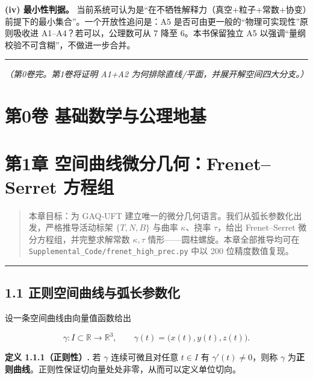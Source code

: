 \textbf{(iv) 最小性判据。}
当前系统可认为是``在不牺牲解释力（真空+粒子+常数+协变）前提下的最小集合''。一个开放性追问是：A5
是否可由更一般的``物理可实现性''原则吸收进 A1--A4？若可以，公理数可从 7
降至 6。本书保留独立 A5 以强调``量纲校验不可含糊''，不做进一步合并。

\begin{center}\rule{0.5\linewidth}{0.5pt}\end{center}

\emph{（第0卷完。第1卷将证明 A1+A2
为何排除直线/平面，并展开解空间四大分支。）}

\section{第0卷
基础数学与公理地基}\label{ux7b2c0ux5377-ux57faux7840ux6570ux5b66ux4e0eux516cux7406ux5730ux57fa}

\section{第1章 空间曲线微分几何：Frenet--Serret
方程组}\label{ux7b2c1ux7ae0-ux7a7aux95f4ux66f2ux7ebfux5faeux5206ux51e0ux4f55frenetserret-ux65b9ux7a0bux7ec4-1}

\begin{quote}
本章目标：为 GAQ‑UFT
建立唯一的微分几何语言。我们从弧长参数化出发，严格推导活动标架
\(\{T,N,B\}\) 与曲率 \(\kappa\)、挠率 \(\tau\)，给出 Frenet--Serret
微分方程组，并完整求解常数 \(\kappa,\tau\)
情形------圆柱螺旋。本章全部推导均可在
\texttt{Supplemental\_Code/frenet\_high\_prec.py} 中以 200
位精度数值复现。
\end{quote}

\begin{center}\rule{0.5\linewidth}{0.5pt}\end{center}

\subsection{1.1
正则空间曲线与弧长参数化}\label{ux6b63ux5219ux7a7aux95f4ux66f2ux7ebfux4e0eux5f27ux957fux53c2ux6570ux5316}

设一条空间曲线由向量值函数给出

\[
\gamma : I \subset \mathbb{R} \longrightarrow \mathbb{R}^3,\qquad \gamma(t)=\bigl(x(t),y(t),z(t)\bigr).
\]

\textbf{定义 1.1.1（正则性）.} 若 \(\gamma\) 连续可微且对任意 \(t\in I\)
有 \(\gamma'(t)\neq 0\)，则称 \(\gamma\)
为\textbf{正则曲线}。正则性保证切向量处处非零，从而可以定义单位切向。

